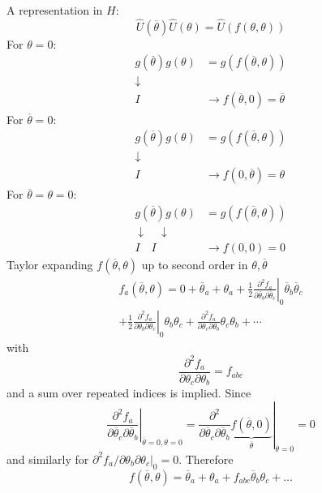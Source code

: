 \documentclass[12pt]{article}
\newcommand{\be}{\begin{equation}}
\newcommand{\ee}{\end{equation}}
\begin{document}
A representation in $H$:
\be
\hat{U}(\overline{\theta}) \hat{U}(\theta)=\hat{U}(f(\theta, \theta))
\label{eq:symmetries3}
\ee
For $\theta = 0$:
\be
\begin{aligned} 
g(\overline{\theta}) g(\theta) &=g(f(\overline{\theta}, \theta)) \\ 
\downarrow \quad\,\\ 
I \quad\,& \rightarrow f(\overline{\theta}, 0)=\overline{\theta}
\end{aligned}
\ee
%
For $\overline\theta = 0$:
\be
\begin{aligned} 
g(\overline{\theta}) g(\theta) &=g(f(\overline{\theta}, \theta)) \\ 
\downarrow \quad\quad\quad\\
I\quad\quad\quad& \rightarrow f(0, \overline{\theta})=\theta 
\end{aligned}
\ee
%
For $\overline\theta = \theta = 0$:
\be
\begin{aligned} 
g(\overline{\theta}) g(\theta) &=g(f(\overline{\theta}, \theta)) \\ 
\downarrow \quad\downarrow\quad\\
I\quad I\quad & \rightarrow f(0, 0)=0
\end{aligned}
\ee
Taylor expanding $f(\overline\theta,\theta)$ up to second order in $\theta,\overline\theta$
\be
\begin{gathered}
f_a(\overline{\theta}, \theta)=0+\overline{\theta}_{a}+\theta_{a}+\left.\frac{1}{2} \frac{\partial^{2} f_{a}}{\partial \overline{\theta}_{b} \partial \overline{\theta}_{c}}\right|_{0} \overline{\theta}_{b} \overline{\theta}_{c}\\
+\left.\frac{1}{2} \frac{\partial^{2} f_{a}}{\partial \theta_{b} \partial \theta_{c}}\right|_{0} \theta_{b} \theta_{c}+
\frac{\partial^{2} f_{a}}{\partial \theta_{c} \partial \theta_{b}} \theta_{c} \theta_{b}+\cdots
\end{gathered}
\ee
with
\be
\frac{\partial^{2} f_{a}}{\partial \theta_{c} \partial \theta_{b}}  = f_{abc}
\ee
and a sum over repeated indices is implied. Since
\be
\left.
\frac{\partial^{2} f_{a}}{\partial \overline\theta_{c} \partial \overline\theta_{b}}
\right|_{\overline\theta=0,\theta=0}
=
\left.
\frac{\partial^{2}}{\partial \overline\theta_{c} \partial \overline\theta_{b}}
\underbrace{f(\overline{\theta},0)}_{\overline\theta}
\right|_{\overline\theta=0}
= 0 
\ee
and similarly for $\partial^{2} f_{a} /\left.\partial \theta_{b} \partial \theta_{c}\right|_{0}=0$. Therefore
\be
f(\overline{\theta}, \theta)=\overline{\theta}_{a}+\theta_{a}+f_{abc} \overline{\theta}_{b} \theta_{c}+\ldots
\ee
\end{document}
